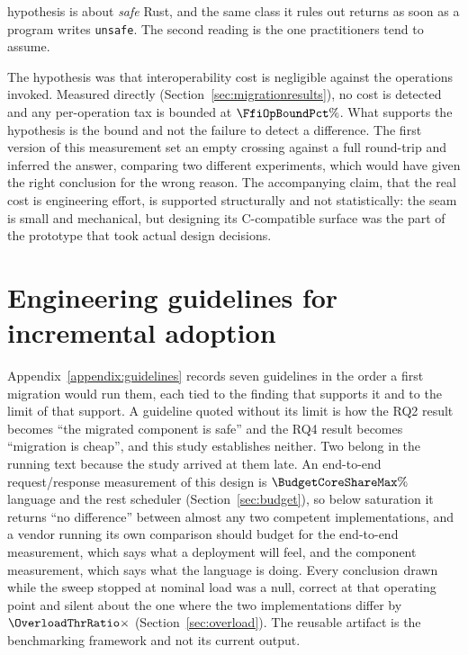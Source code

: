 \begin{description}
        hypothesis is about \emph{safe} Rust, and the same class it rules out returns as soon as a
        program writes \texttt{unsafe}. The second reading is the one practitioners tend to
        assume.
  \item[H3: supported, and tested the right way on the second attempt.] The hypothesis was
        that interoperability cost is negligible against the operations invoked. Measured
        directly (Section~\ref{sec:migrationresults}), no cost is detected and any per-operation
        tax is bounded at $\FfiOpBoundPct\%$. What supports the hypothesis is the bound and not
        the failure to detect a difference. The first version of this measurement set an empty
        crossing against a full round-trip and inferred the answer, comparing two different
        experiments, which would have given the right conclusion for the wrong reason. The
        accompanying claim, that the real cost is engineering effort, is supported structurally
        and not statistically: the seam is small and mechanical, but designing its C-compatible
        surface was the part of the prototype that took actual design decisions.
\end{description}

\section{Engineering guidelines for incremental adoption}
\label{sec:guidelines}
Appendix~\ref{appendix:guidelines} records seven guidelines in the order a first migration would
run them, each tied to the finding that supports it and to the limit of that support. A guideline
quoted without its limit is how the RQ2 result becomes ``the migrated component is safe'' and the
RQ4 result becomes ``migration is cheap'', and this study establishes neither. Two belong in the
running text because the study arrived at them late. An end-to-end request/response measurement of
this design is $\BudgetCoreShareMax\%$ language and the rest scheduler
(Section~\ref{sec:budget}), so below saturation it returns ``no difference'' between almost any
two competent implementations, and a vendor running its own comparison should budget for the
end-to-end measurement, which says what a deployment will feel, and the component measurement,
which says what the language is doing. Every conclusion drawn while the sweep stopped at nominal
load was a null, correct at that operating point and silent about the one where the two
implementations differ by $\OverloadThrRatio\times$ (Section~\ref{sec:overload}). The reusable
artifact is the benchmarking framework and not its current output.

